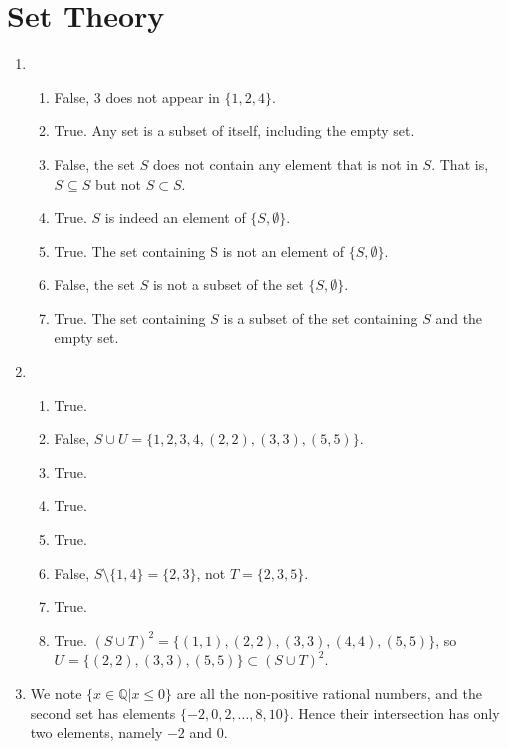 \section{Set Theory}
\begin{enumerate}
    \item \begin{enumerate}[label=(\alph*)]
        \item False, 3 does not appear in $\{1, 2, 4\}$.
        \item True. Any set is a subset of itself, including the empty set.
        \item False, the set $S$ does not contain any element that is not in $S$. That is, $S \subseteq S$ but not $S \subset S$.
        \item True. $S$ is indeed an element of $\{S, \emptyset\}$.
        \item True. The set containing S is not an element of $\{S, \emptyset\}$.
        \item False, the set $S$ is not a subset of the set $\{S, \emptyset\}$.
        \item True. The set containing $S$ is a subset of the set containing $S$ and the empty set.
    \end{enumerate}
    
    \item \begin{enumerate}[label=(\alph*)]
        \item True.
        \item False, $S \cup U = \{1, 2, 3, 4, (2, 2), (3, 3), (5, 5)\}$.
        \item True.
        \item True.
        \item True.
        \item False, $S \setminus \{1, 4\} = \{2, 3\}$, not $T = \{2, 3, 5\}$.
        \item True.
        \item True. $(S \cup T)^2 = \{(1,1), (2,2), (3,3), (4,4), (5,5)\}$, so $U = \{(2,2), (3,3), (5,5)\} \subset (S \cup T)^2$.
    \end{enumerate}
    \item We note $\{x \in \mathbb{Q} \vert x \leq 0\}$ are all the non-positive rational numbers, and the second set has elements $\{-2, 0, 2, \dots, 8, 10\}$. Hence their intersection has only two elements, namely $-2$ and $0$.
\end{enumerate}

